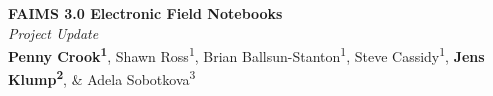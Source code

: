 \documentclass[a0,portrait]{a0poster}
\begin{document}


\begin{minipage}[b]{0.75\linewidth}
\veryHuge \color{White} \textbf{FAIMS 3.0 Electronic Field Notebooks} \color{faimsorange}\\[0.5cm] %
\Huge\textit{Project Update}\\[2cm] %
\large \color{white} \textbf{Penny Crook\textsuperscript{1}}, Shawn Ross\textsuperscript{1}, Brian Ballsun-Stanton\textsuperscript{1}, Steve Cassidy\textsuperscript{1}, \textbf{Jens Klump\textsuperscript{2}}, \& Adela Sobotkova\textsuperscript{3}\\[0.5cm] %
\end{minipage}
%


\vfill
\end{document}
